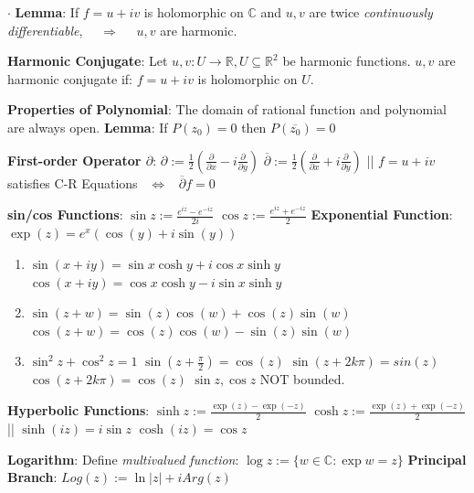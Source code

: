 \documentclass[9pt]{article}
\begin{document}
$\cdot$ \textbf{Lemma}: If $f=u+iv$ is holomorphic on $\mathbb{C}$ and $u,v$ are twice \textit{continuously differentiable}, \ \ $\Rightarrow$ \ \ $u,v$ are harmonic.

\textbf{Harmonic Conjugate}: {\small Let $u,v:U\to\mathbb{R},U\subseteq\mathbb{R}^2 $ be harmonic functions. $u,v$ are harmonic conjugate if: $f=u+iv$ is holomorphic on $U$.}

\textbf{Properties of Polynomial}: {\small The domain of rational function and polynomial are always open.} \quad \quad \textbf{Lemma}: If $P(z_0)=0$ then $P(\overline{z_0})=0$

\textbf{First-order Operator $\partial$}: $\partial:=\frac{1}{2}\left(\frac{\partial}{\partial x}-i\frac{\partial}{\partial y}\right)$ \quad \quad $\overline{\partial}:=\frac{1}{2}\left(\frac{\partial}{\partial x}+i\frac{\partial}{\partial y}\right)$ \quad || \quad $f=u+iv$ satisfies C-R Equations \ $\Leftrightarrow$ \ $\overline{\partial}f=0$

\textbf{sin/cos Functions}: $\sin z:=\frac{e^{iz}-e^{-iz}}{2i}$ \quad \quad $\cos z:=\frac{e^{iz}+e^{-iz}}{2}$ \quad \quad \textbf{Exponential Function}: $\exp(z)=e^x(\cos(y)+i\sin(y))$

\begin{enumerate}[itemsep=-2pt, topsep=-2pt]
    \item $\sin(x+iy)=\sin x\cosh y+i\cos x\sinh y$ \quad $\cos(x+iy)=\cos x\cosh y-i\sin x\sinh y$
    \item $\sin(z+w)=\sin(z)\cos(w)+\cos(z)\sin(w)$ \quad $\cos(z+w)=\cos(z)\cos(w)-\sin(z)\sin(w)$ 
    \item $\sin^2z+\cos^2z=1$ \quad $\sin(z+\frac{\pi}{2})=\cos(z)$ \quad $\sin(z+2k\pi)=sin(z)$ \quad $\cos(z+2k\pi)=\cos(z)$ \quad \quad \star $\sin z,\cos z$ NOT bounded.
\end{enumerate}

\textbf{Hyperbolic Functions}: $\sinh z:=\frac{\exp(z)-\exp(-z)}{2}$ \quad \quad $\cosh z:=\frac{\exp(z)+\exp(-z)}{2}$ \quad \quad || \quad \quad $\sinh(iz)=i\sin z$ \quad $\cosh(iz)=\cos z$

\textbf{Logarithm}: Define \textit{multivalued function}: $\log{z}:=\{w\in\mathbb{C}:\exp{w}=z\}$ \quad \quad \quad \textbf{Principal Branch}: $Log(z):=\ln|z|+iArg(z)$
\end{document}
